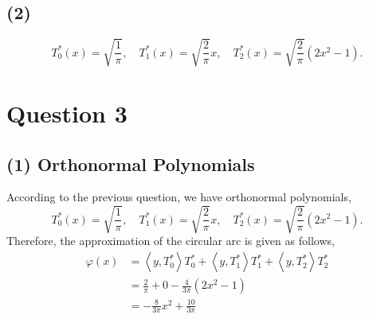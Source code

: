 \documentclass[11pt,a4paper]{article}
\theoremstyle{plain}
\begin{document}
\subsection*{(2)}
\begin{equation}
T_0^*(x)=\sqrt{\frac{1}{\pi}}, \quad T_1^*(x)=\sqrt{\frac{2}{\pi}} x, \quad T_2^*(x)=\sqrt{\frac{2}{\pi}}\left(2 x^2-1\right) .
\end{equation}

\section*{Question 3}
\subsection*{(1) Orthonormal Polynomials}
\noindent According to the previous question, we have orthonormal polynomials,\\
\begin{equation}
T_0^*(x)=\sqrt{\frac{1}{\pi}}, \quad T_1^*(x)=\sqrt{\frac{2}{\pi}} x, \quad T_2^*(x)=\sqrt{\frac{2}{\pi}}\left(2 x^2-1\right) .
\end{equation}
Therefore, the approximation of the circular arc is given as follows,\\
\begin{equation}
\begin{aligned}
\varphi(x) & =\left\langle y, T_0^*\right\rangle T_0^*+\left\langle y, T_1^*\right\rangle T_1^*+\left\langle y, T_2^*\right\rangle T_2^* \\
& =\frac{2}{\pi}+0-\frac{4}{3 \pi}\left(2 x^2-1\right) \\
& =-\frac{8}{3 \pi} x^2+\frac{10}{3 \pi} 
\end{aligned}
\end{equation}
\end{document}
